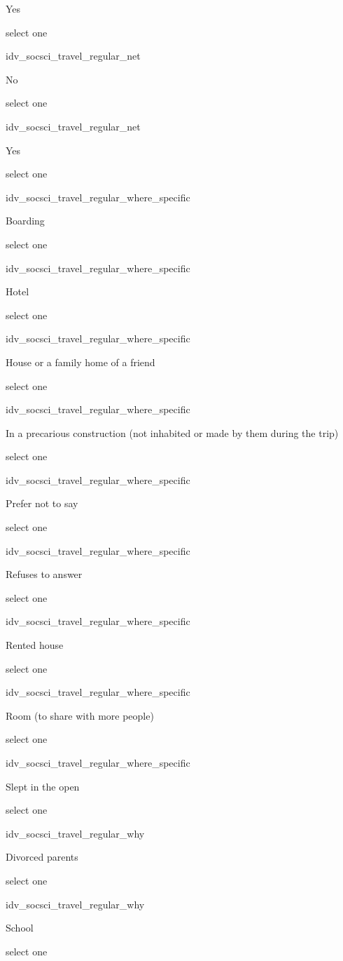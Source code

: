 \documentclass[]{article}
\begin{document}
Yes

select one

idv\_socsci\_travel\_regular\_net

No

select one

idv\_socsci\_travel\_regular\_net

Yes

select one

idv\_socsci\_travel\_regular\_where\_specific

Boarding

select one

idv\_socsci\_travel\_regular\_where\_specific

Hotel

select one

idv\_socsci\_travel\_regular\_where\_specific

House or a family home of a friend

select one

idv\_socsci\_travel\_regular\_where\_specific

In a precarious construction (not inhabited or made by them during the
trip)

select one

idv\_socsci\_travel\_regular\_where\_specific

Prefer not to say

select one

idv\_socsci\_travel\_regular\_where\_specific

Refuses to answer

select one

idv\_socsci\_travel\_regular\_where\_specific

Rented house

select one

idv\_socsci\_travel\_regular\_where\_specific

Room (to share with more people)

select one

idv\_socsci\_travel\_regular\_where\_specific

Slept in the open

select one

idv\_socsci\_travel\_regular\_why

Divorced parents

select one

idv\_socsci\_travel\_regular\_why

School

select one
\end{document}

